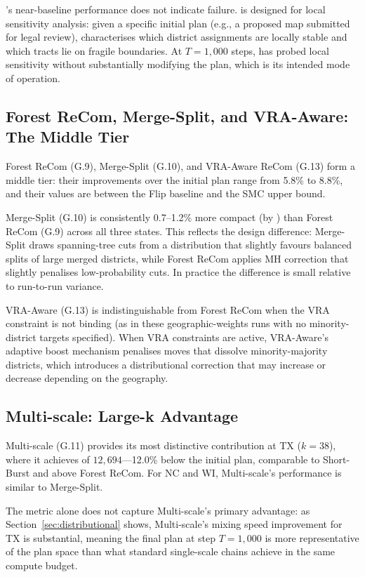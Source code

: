\flip{}'s near-baseline performance does not indicate failure.
\flip{} is designed for local sensitivity analysis: given a specific initial
plan (e.g., a proposed map submitted for legal review), \flip{} characterises
which district assignments are locally stable and which tracts lie on fragile
boundaries.
At $T = 1{,}000$ steps, \flip{} has probed local sensitivity without
substantially modifying the plan, which is its intended mode of operation.

\subsection{Forest ReCom, Merge-Split, and VRA-Aware: The Middle Tier}

Forest ReCom (G.9), Merge-Split (G.10), and VRA-Aware ReCom (G.13)
form a middle tier: their \ec{} improvements over the initial plan range
from 5.8\% to 8.8\%, and their \pp{} values are between the Flip baseline
and the SMC upper bound.

Merge-Split (G.10) is consistently 0.7--1.2\% more compact (by \ec{}) than
Forest ReCom (G.9) across all three states.
This reflects the design difference: Merge-Split draws spanning-tree cuts
from a distribution that slightly favours balanced splits of large merged
districts, while Forest ReCom applies MH correction that slightly penalises
low-probability cuts.
In practice the difference is small relative to run-to-run variance.

VRA-Aware (G.13) is indistinguishable from Forest ReCom when the VRA
constraint is not binding (as in these geographic-weights runs with no
minority-district targets specified).
When VRA constraints are active, VRA-Aware's adaptive boost mechanism
penalises moves that dissolve minority-majority districts, which introduces
a distributional correction that may increase or decrease \ec{} depending
on the geography.

\subsection{Multi-scale: Large-k Advantage}

Multi-scale (G.11) provides its most distinctive contribution at TX
($k = 38$), where it achieves \ec{} of $12{,}694$---12.0\% below the
initial plan, comparable to Short-Burst and above Forest ReCom.
For NC and WI, Multi-scale's \ec{} performance is similar to Merge-Split.

The \ec{} metric alone does not capture Multi-scale's primary advantage:
as Section~\ref{sec:distributional} shows, Multi-scale's mixing speed
improvement for TX is substantial, meaning the final plan at step $T =
1{,}000$ is more representative of the plan space than what standard
single-scale chains achieve in the same compute budget.

